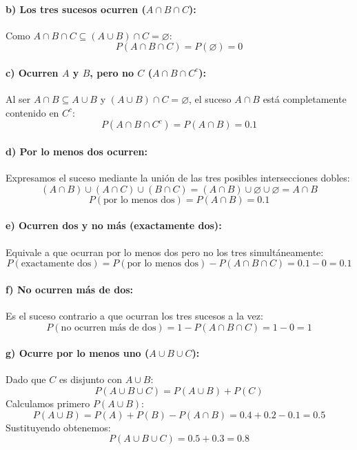 \begin{problema}
\paragraph{b) Los tres sucesos ocurren ($A \cap B \cap C$):}
Como $A \cap B \cap C \subseteq (A \cup B) \cap C = \varnothing$:
\[
    P(A \cap B \cap C) = P(\varnothing) = 0
\]

\paragraph{c) Ocurren $A$ y $B$, pero no $C$ ($A \cap B \cap C^c$):}
Al ser $A \cap B \subseteq A \cup B$ y $(A \cup B) \cap C = \varnothing$, el suceso $A \cap B$ está completamente contenido en $C^c$:
\[
    P(A \cap B \cap C^c) = P(A \cap B) = 0.1
\]

\paragraph{d) Por lo menos dos ocurren:}
Expresamos el suceso mediante la unión de las tres posibles intersecciones dobles:
\[
    (A \cap B) \cup (A \cap C) \cup (B \cap C) = (A \cap B) \cup \varnothing \cup \varnothing = A \cap B
\]
\[
    P(\text{por lo menos dos}) = P(A \cap B) = 0.1
\]

\paragraph{e) Ocurren dos y no más (exactamente dos):}
Equivale a que ocurran por lo menos dos pero no los tres simultáneamente:
\[
    P(\text{exactamente dos}) = P(\text{por lo menos dos}) - P(A \cap B \cap C) = 0.1 - 0 = 0.1
\]

\paragraph{f) No ocurren más de dos:}
Es el suceso contrario a que ocurran los tres sucesos a la vez:
\[
    P(\text{no ocurren más de dos}) = 1 - P(A \cap B \cap C) = 1 - 0 = 1
\]

\paragraph{g) Ocurre por lo menos uno ($A \cup B \cup C$):}
Dado que $C$ es disjunto con $A \cup B$:
\[
    P(A \cup B \cup C) = P(A \cup B) + P(C)
\]
Calculamos primero $P(A \cup B)$:
\[
    P(A \cup B) = P(A) + P(B) - P(A \cap B) = 0.4 + 0.2 - 0.1 = 0.5
\]
Sustituyendo obtenemos:
\[
    P(A \cup B \cup C) = 0.5 + 0.3 = 0.8
\]


\end{problema}
